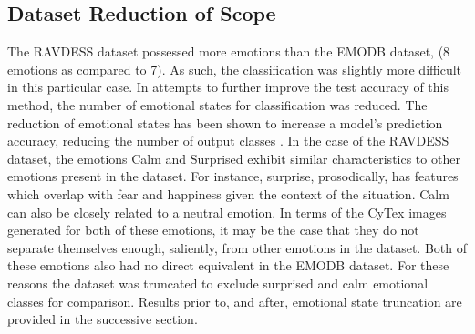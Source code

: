\subsection{Dataset Reduction of Scope}
The RAVDESS dataset possessed more emotions than the EMODB dataset, (8 emotions as compared to 7). As such, the classification was slightly more difficult in this particular case. In attempts to further improve the test accuracy of this method, the number of emotional states for classification was reduced. The reduction of emotional states has been shown to increase a model's prediction accuracy, reducing the number of output classes \cite{zhou2016deep}. In the case of the RAVDESS dataset, the emotions Calm and Surprised exhibit similar characteristics to other emotions present in the dataset. For instance, surprise, prosodically, has features which overlap with fear and happiness given the context of the situation. Calm can also be closely related to a neutral emotion. In terms of the CyTex images generated for both of these emotions, it may be the case that they do not separate themselves enough, saliently, from other emotions in the dataset. Both of these emotions also had no direct equivalent in the EMODB dataset. For these reasons the dataset was truncated to exclude surprised and calm emotional classes for comparison. Results prior to, and after, emotional state truncation are provided in the successive section.

